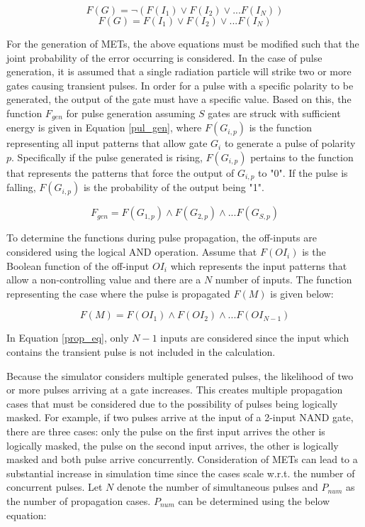 \documentclass[conference]{IEEEtran}
\newcommand{\squeezeup}{\vspace{-2mm}}
\begin{document}
\small

\begin{equation} \label{OR_RISING}
F(G) = \lnot (F(I_1) \lor F(I_2) \lor ... F(I_N))
\end{equation}
\squeezeup
\begin{equation} \label{OR_FALLING}
F(G) = F(I_1) \lor F(I_2) \lor ... F(I_N)
\end{equation}

\normalsize

For the generation of METs, the above equations must be modified such that the joint probability of the error occurring is considered. In the case of pulse generation, it is assumed that a single radiation particle will strike two or more gates causing transient pulses. In order for a pulse with a specific polarity to be generated, the output of the gate must have a specific value. Based on this, the function $F_{gen}$ for pulse generation assuming $S$ gates are struck with sufficient energy is given in Equation \ref{pul_gen}, where $F(G_{i,p})$ is the function representing all input patterns that allow gate $G_i$ to generate a pulse of polarity $p$. Specifically if the pulse generated is rising, $F(G_{i,p})$ pertains to the function that represents the patterns that force the output of $G_{i,p}$ to "0". If the pulse is falling, $F(G_{i,p})$ is the probability of the output being "1".

\small
\begin{equation} \label{pul_gen}
F_{gen} = F(G_{1, p}) \land F(G_{2, p}) \land ... F(G_{S, p})
\end{equation}
\normalsize

To determine the functions during pulse propagation, the off-inputs are considered using the logical AND operation. Assume that $F(OI_i)$ is the Boolean function of the off-input $OI_i$ which represents the input patterns that allow a non-controlling value and there are a $N$ number of inputs. The function representing the case where the pulse is propagated $F(M)$ is given below:

\small
\begin{equation} \label{prop_eq}
F(M) = F(OI_1) \land F(OI_2) \land ... F(OI_{N-1})
\end{equation}
\normalsize

In Equation \ref{prop_eq}, only $N-1$ inputs are considered since the input which contains the transient pulse is not included in the calculation. 

Because the simulator considers multiple generated pulses, the likelihood of two or more pulses arriving at a gate increases. This creates multiple propagation cases that must be considered due to the possibility of pulses being logically masked. For example, if two pulses arrive at the input of a 2-input NAND gate, there are three cases: only the pulse on the first input arrives the other is logically masked, the pulse on the second input arrives, the other is logically masked and both pulse arrive concurrently. Consideration of METs can lead to a substantial increase in simulation time since the cases scale w.r.t. the number of concurrent pulses. Let $N$ denote the number of simultaneous pulses and $P_{num}$ as the number of propagation cases. $P_{num}$ can be determined using the below equation:
\end{document}
